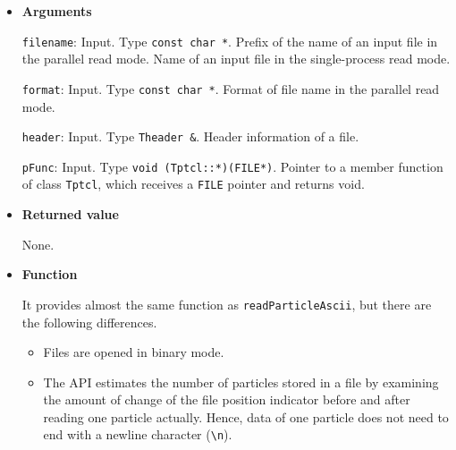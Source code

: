\begin{itemize}

\item {\bf Arguments}

\texttt{filename}: Input. Type \texttt{const char *}. Prefix of the name of an input file in the parallel read mode. Name of an input file in the single-process read mode.

\texttt{format}: Input. Type \texttt{const char *}. Format of file name in the parallel read mode.

\texttt{header}: Input. Type \texttt{Theader \&}. Header information of a file.

\texttt{pFunc}: Input. Type \texttt{void (Tptcl::*)(FILE*)}. Pointer to a member function of class \texttt{Tptcl}, which receives a \texttt{FILE} pointer and returns void.


\item {\bf Returned value}

None.

\item {\bf Function}

It provides almost the same function as \texttt{readParticleAscii}, but there are the following differences.
\begin{itemize}
\item Files are opened in binary mode.
\item The API estimates the number of particles stored in a file by examining the amount of change of the file position indicator before and after reading one particle actually. Hence, data of one particle does not need to end with a newline character (\texttt{\textbackslash n}).
\end{itemize}

\end{itemize}

\label{sec:writeParticleAscii}

